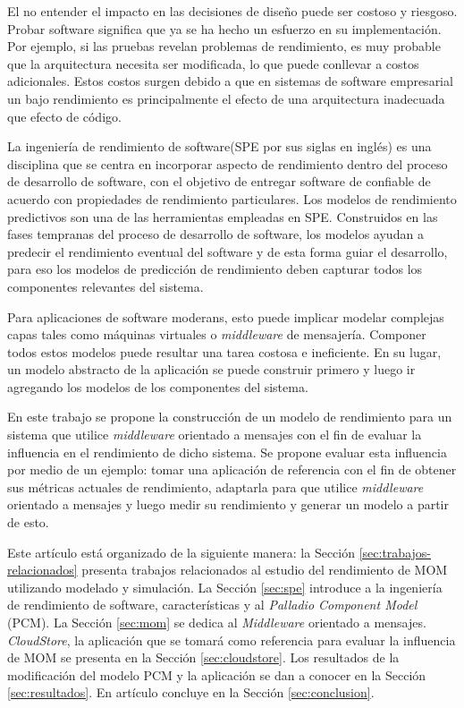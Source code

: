\documentclass[article]{IEEEtran}
\begin{document}
El no entender el impacto en las decisiones de diseño puede ser costoso y riesgoso. Probar software significa que ya se ha hecho un esfuerzo en su implementación. Por ejemplo, si las pruebas revelan problemas de rendimiento, es muy probable que la arquitectura necesita ser modificada, lo que puede conllevar a costos adicionales. Estos costos surgen debido a que en sistemas de software empresarial un bajo rendimiento es principalmente el efecto de una arquitectura inadecuada que efecto de código.

La ingeniería de rendimiento de software(SPE por sus siglas en inglés) es una disciplina que se centra en incorporar aspecto de rendimiento dentro del proceso de desarrollo de software, con el objetivo de entregar software de confiable de acuerdo con propiedades de rendimiento particulares. Los modelos de rendimiento predictivos son una de las herramientas empleadas en SPE. Construidos en las fases tempranas del proceso de desarrollo de software, los modelos ayudan a predecir el rendimiento eventual del software y de esta forma guiar el desarrollo, para eso los modelos de predicción de rendimiento deben capturar todos los componentes relevantes del sistema.

Para aplicaciones de software moderans, esto puede implicar modelar complejas capas tales como máquinas virtuales o \emph{middleware} de mensajería. Componer todos estos modelos puede resultar una tarea costosa e ineficiente. En su lugar, un modelo abstracto de la aplicación se puede construir primero y luego ir agregando los modelos de los componentes del sistema. 

En este trabajo se propone la construcción de un modelo de rendimiento para un sistema que utilice \emph{middleware} orientado a mensajes con el fin de evaluar la influencia en el rendimiento de dicho sistema. Se propone evaluar esta influencia por medio de un ejemplo: tomar una aplicación de referencia con el fin de obtener sus métricas actuales de rendimiento, adaptarla para que utilice \emph{middleware} orientado a mensajes y luego medir su rendimiento y generar un modelo a partir de esto.  

Este artículo está organizado de la siguiente manera: la Sección \ref{sec:trabajos-relacionados} presenta trabajos relacionados al estudio del rendimiento de MOM utilizando modelado y simulación. La Sección \ref{sec:spe} introduce a la ingeniería de rendimiento de software, características y al \emph{Palladio Component Model} (PCM). La Sección \ref{sec:mom} se dedica al \emph{Middleware} orientado a mensajes. \emph{CloudStore}, la aplicación que se tomará como referencia para evaluar la influencia de MOM se presenta en la Sección \ref{sec:cloudstore}. Los resultados de la modificación del modelo PCM y la aplicación se dan a conocer en la Sección \ref{sec:resultados}. En artículo concluye en la Sección \ref{sec:conclusion}.
\end{document}
